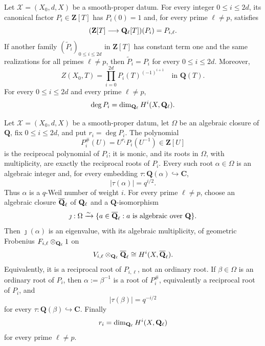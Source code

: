 \begin{proposition}
\label{prop:integral-recovery}


Let \(\mathscr X=(X_0,d,X)\) be a smooth-proper datum.  For every integer
\(0\leq i\leq2d\), its canonical factor \(P_i\in\mathbf Z[T]\) has
\(P_i(0)=1\) and, for every prime \(\ell\neq p\), satisfies
\[
 (\mathbf Z[T]\longrightarrow\mathbf Q_{\ell}[T])(P_i)=P_{i,\ell}.
\]
If another family
\((\widetilde P_i)_{0\leq i\leq2d}\) in \(\mathbf Z[T]\) has constant
term one and the same
realizations for all primes \(\ell\neq p\), then
\(\widetilde P_i=P_i\) for every \(0\leq i\leq2d\).  Moreover,
\[
 Z(X_0,T)=\prod_{i=0}^{2d}P_i(T)^{(-1)^{i+1}}
 \quad\text{in }\mathbf Q(T).
\]
For every \(0\leq i\leq2d\) and every prime \(\ell\neq p\),
\[
 \deg P_i=\dim_{\mathbf Q_{\ell}}H^i(X,\mathbf Q_{\ell}).
\]
\end{proposition}



\begin{proposition}
\label{prop:arithmetic-roots}


Let \(\mathscr X=(X_0,d,X)\) be a smooth-proper datum, let \(\Omega\) be an
algebraic closure of \(\mathbf Q\), fix \(0\leq i\leq2d\), and put
\(r_i=\deg P_i\).  The polynomial
\[
 P_i^\#(U)=U^{r_i}P_i(U^{-1})\in\mathbf Z[U]
\]
is the reciprocal polynomial of \(P_i\); it is monic, and its roots in
\(\Omega\), with multiplicity, are exactly the
reciprocal roots of \(P_i\).  Every such root
\(\alpha\in\Omega\) is an algebraic integer and, for every
embedding \(\tau:\mathbf Q(\alpha)\hookrightarrow\mathbf C\),
\[
 |\tau(\alpha)|=q^{i/2}.
\]
Thus \(\alpha\) is a \(q\)-Weil number of weight \(i\).  For every prime
\(\ell\neq p\), choose an algebraic closure \(\overline{\mathbf Q}_\ell\) of \(\mathbf Q_{\ell}\) and a
\(\mathbf Q\)-isomorphism
\[
 \jmath:\Omega\xrightarrow{\sim}
 \{a\in\overline{\mathbf Q}_\ell:a\text{ is algebraic over }\mathbf Q\}.
\]
Then \(\jmath(\alpha)\) is an
eigenvalue, with its algebraic multiplicity, of geometric Frobenius
\(F_{i,\ell}\otimes_{\mathbf Q_{\ell}}1\) on
\[
 V_{i,\ell}\otimes_{\mathbf Q_{\ell}}\overline{\mathbf Q}_\ell\cong H^i(X,\overline{\mathbf Q}_\ell).
\]
Equivalently, it is a reciprocal root of \(P_{i,\ell}\), not an ordinary
root.  If \(\beta\in\Omega\) is an ordinary root of \(P_i\), then
\(\alpha:=\beta^{-1}\) is a root of \(P_i^\#\), equivalently a reciprocal
root of \(P_i\), and
\[
 |\tau(\beta)|=q^{-i/2}
\]
for every \(\tau:\mathbf Q(\beta)\hookrightarrow\mathbf C\).  Finally
\[
 r_i=\dim_{\mathbf Q_{\ell}}H^i(X,\mathbf Q_{\ell})
\]
for every prime \(\ell\neq p\).
\end{proposition}


